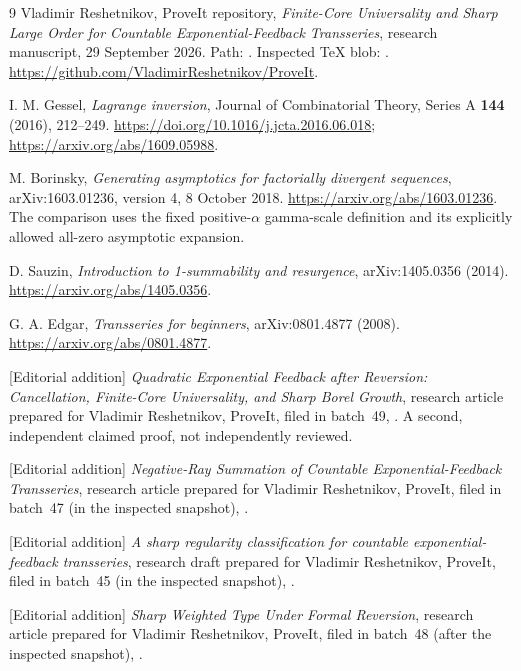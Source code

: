 \documentclass[11pt,a4paper]{article}
\numberwithin{equation}{section}
\theoremstyle{definition}
\theoremstyle{remark}\newtheorem{remark}[theorem]{Remark}
\begin{document}
\begin{thebibliography}{9}
Vladimir Reshetnikov, ProveIt repository,
\emph{Finite-Core Universality and Sharp Large Order for Countable
Exponential-Feedback Transseries}, research manuscript, 29 September 2026.
Path: .
Inspected TeX blob: .
\url{https://github.com/VladimirReshetnikov/ProveIt}.

I. M. Gessel, \emph{Lagrange inversion}, Journal of Combinatorial Theory,
Series A \textbf{144} (2016), 212--249.
\url{https://doi.org/10.1016/j.jcta.2016.06.018};
\url{https://arxiv.org/abs/1609.05988}.

M. Borinsky, \emph{Generating asymptotics for factorially divergent sequences},
arXiv:1603.01236, version 4, 8 October 2018.
\url{https://arxiv.org/abs/1603.01236}.
The comparison uses the fixed positive-$\alpha$ gamma-scale definition and
its explicitly allowed all-zero asymptotic expansion.

D. Sauzin, \emph{Introduction to 1-summability and resurgence},
arXiv:1405.0356 (2014).
\url{https://arxiv.org/abs/1405.0356}.

G. A. Edgar, \emph{Transseries for beginners}, arXiv:0801.4877 (2008).
\url{https://arxiv.org/abs/0801.4877}.

[Editorial addition] \emph{Quadratic Exponential Feedback after Reversion:
Cancellation, Finite-Core Universality, and Sharp Borel Growth}, research
article prepared for Vladimir Reshetnikov, ProveIt, filed in batch~49,
.
A second, independent claimed proof, not independently reviewed.

[Editorial addition] \emph{Negative-Ray Summation of Countable
Exponential-Feedback Transseries}, research article prepared for Vladimir
Reshetnikov, ProveIt, filed in batch~47 (in the inspected snapshot),
.

[Editorial addition] \emph{A sharp regularity classification for
countable exponential-feedback transseries}, research draft prepared for
Vladimir Reshetnikov, ProveIt, filed in batch~45 (in the inspected
snapshot),
.

[Editorial addition] \emph{Sharp Weighted Type Under Formal Reversion},
research article prepared for Vladimir Reshetnikov, ProveIt, filed in
batch~48 (after the inspected snapshot),
.
\end{thebibliography}
\end{document}
